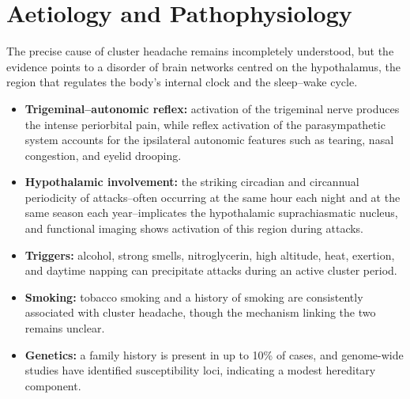 \section*{Aetiology and Pathophysiology}
The precise cause of cluster headache remains incompletely understood, but the evidence points to a disorder of brain networks centred on the hypothalamus, the region that regulates the body's internal clock and the sleep--wake cycle.
\begin{itemize}
    \item \textbf{Trigeminal--autonomic reflex:} activation of the trigeminal nerve produces the intense periorbital pain, while reflex activation of the parasympathetic system accounts for the ipsilateral autonomic features such as tearing, nasal congestion, and eyelid drooping.
    \item \textbf{Hypothalamic involvement:} the striking circadian and circannual periodicity of attacks--often occurring at the same hour each night and at the same season each year--implicates the hypothalamic suprachiasmatic nucleus, and functional imaging shows activation of this region during attacks.
    \item \textbf{Triggers:} alcohol, strong smells, nitroglycerin, high altitude, heat, exertion, and daytime napping can precipitate attacks during an active cluster period.
    \item \textbf{Smoking:} tobacco smoking and a history of smoking are consistently associated with cluster headache, though the mechanism linking the two remains unclear.
    \item \textbf{Genetics:} a family history is present in up to 10\% of cases, and genome-wide studies have identified susceptibility loci, indicating a modest hereditary component.
\end{itemize}

